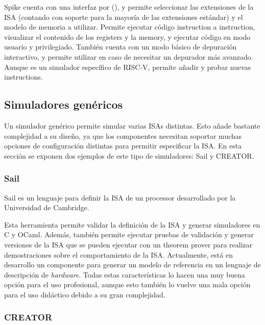 Spike cuenta con una interfaz por 
(), y permite seleccionar las extensiones de la \gls{ISA}
(contando con soporte para la mayoría de las extensiones estándar) y el modelo
de memoria a utilizar. Permite ejecutar código \gls{instruction} a
\gls{instruction}, visualizar el contenido de los \glspl{register} y la
\gls{memory}, y ejecutar código en modo usuario y privilegiado. También cuenta
con un modo básico de depuración interactivo, y permite utilizar 
en caso de necesitar un depurador más avanzado. Aunque es un simulador
específico de RISC-V, permite añadir y probar nuevas \glspl{instruction}.



\subsection{Simuladores genéricos}

Un simulador genérico permite simular varias \glspl{ISA} distintas. Esto añade
bastante complejidad a su diseño, ya que los componentes necesitan soportar
muchas opciones de configuración distintas para permitir especificar la
\gls{ISA}. En esta sección se exponen dos ejemplos de este tipo de simuladores:
Sail y CREATOR.

\subsubsection{Sail}

Sail \parencite{sail} es un lenguaje para definir la \gls{ISA} de un
\gls{processor} desarrollado por la Universidad de Cambridge.

Esta herramienta permite validar la definición de la \gls{ISA} y generar
simuladores en C y OCaml. Además, también permite ejecutar pruebas de validación
y generar versiones de la \gls{ISA} que se pueden ejecutar con un \gls{theorem
prover} para realizar demostraciones sobre el comportamiento de la \gls{ISA}.
Actualmente, está en desarrollo un componente para generar un modelo de
referencia en un lenguaje de descripción de \textit{hardware}. Todas estas
características lo hacen una muy buena opción para el uso profesional, aunque
esto también lo vuelve una mala opción para el uso didáctico debido a su gran
complejidad.

\subsubsection{CREATOR}

